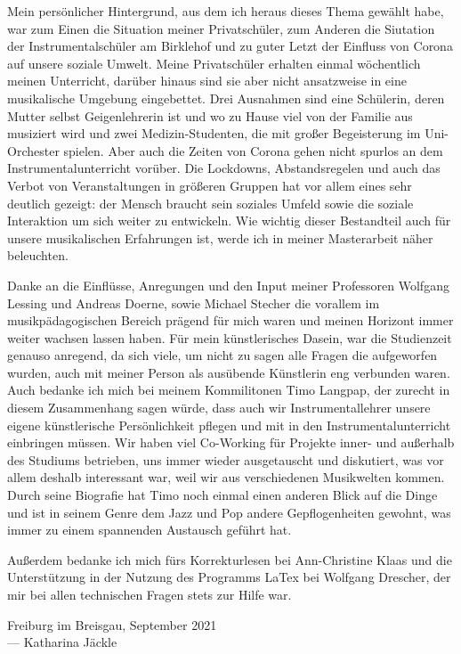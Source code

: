 
Mein persönlicher Hintergrund, aus dem ich heraus dieses Thema gewählt habe, war
zum Einen die Situation meiner Privatschüler, zum Anderen die Siutation der
Instrumentalschüler am Birklehof und zu guter Letzt der Einfluss von Corona auf
unsere soziale Umwelt. Meine Privatschüler erhalten einmal wöchentlich meinen
Unterricht, darüber hinaus sind sie aber nicht ansatzweise in eine musikalische
Umgebung eingebettet. Drei Ausnahmen sind eine Schülerin, deren Mutter
selbst Geigenlehrerin ist und wo zu Hause viel von der Familie aus musiziert wird und zwei
Medizin-Studenten, die mit großer Begeisterung im Uni-Orchester spielen. 
Aber auch die Zeiten von Corona gehen nicht spurlos an dem Instrumentalunterricht
vorüber. Die Lockdowns, Abstandsregelen und auch das Verbot von Veranstaltungen
in größeren Gruppen hat vor allem eines sehr deutlich gezeigt: der Mensch
braucht sein soziales Umfeld sowie die soziale Interaktion um sich weiter zu
entwickeln. Wie wichtig dieser Bestandteil auch für unsere musikalischen
Erfahrungen ist, werde ich in meiner Masterarbeit näher beleuchten.

Danke an die Einflüsse, Anregungen und den Input meiner Professoren Wolfgang
Lessing und Andreas Doerne, sowie Michael Stecher die vorallem im musikpädagogischen Bereich prägend
für mich waren und meinen Horizont immer weiter wachsen lassen haben. Für mein
künstlerisches Dasein, war die Studienzeit genauso anregend, da sich viele, um
nicht zu sagen alle Fragen die aufgeworfen wurden, auch mit meiner Person als
ausübende Künstlerin eng verbunden waren. Auch bedanke ich mich bei meinem
Kommilitonen Timo
Langpap, der zurecht in diesem Zusammenhang sagen würde, dass auch wir
Instrumentallehrer unsere eigene künstlerische Persönlichkeit pflegen und mit in
den Instrumentalunterricht einbringen müssen. Wir haben viel Co-Working für
Projekte inner- und außerhalb des Studiums
betrieben, uns immer wieder ausgetauscht und diskutiert, was vor allem deshalb
interessant war, weil wir aus verschiedenen Musikwelten kommen. Durch seine Biografie
hat Timo noch einmal einen anderen Blick auf die Dinge und ist in seinem Genre dem
Jazz und Pop andere Gepflogenheiten gewohnt, was immer zu einem
spannenden Austausch geführt hat. 

Außerdem bedanke ich mich fürs Korrekturlesen bei Ann-Christine Klaas und die Unterstützung in der
Nutzung des Programms LaTex bei Wolfgang Drescher, der mir bei allen technischen Fragen
stets zur Hilfe war. 




\vspace{0.5cm}

\begin{flushright}
	{
		\small
		Freiburg im Breisgau, September 2021\\
		--- Katharina Jäckle
	}
\end{flushright}
